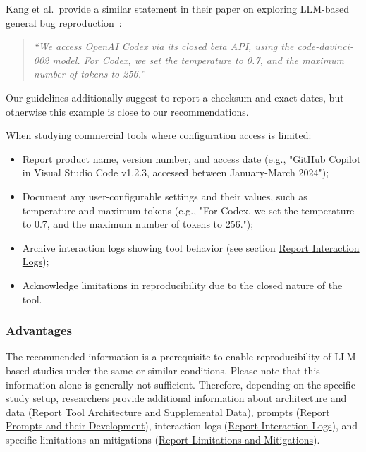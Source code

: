Kang et al.~provide a similar statement in their paper on exploring LLM-based general bug reproduction~\cite{DBLP:conf/icse/KangYY23}:

\begin{quote}
\it
``We access OpenAI Codex via its closed beta API, using the code-davinci-002 model. For Codex, we set the temperature to 0.7, and the maximum number of tokens to 256.''
\end{quote}

Our guidelines additionally suggest to report a checksum and exact dates, but otherwise this example is close to our recommendations. 


When studying commercial tools where configuration access is limited:
\begin{itemize}
\item Report product name, version number, and access date (e.g., "GitHub Copilot in Visual Studio Code v1.2.3, accessed between January-March 2024");
\item Document any user-configurable settings and their values, such as temperature and maximum tokens (e.g., "For Codex, we set the temperature to 0.7, and the maximum number of tokens to 256.");
\item Archive interaction logs showing tool behavior (see section \href{/guidelines/report-interaction-logs}{Report Interaction Logs});
\item Acknowledge limitations in reproducibility due to the closed nature of the tool.
\end{itemize}


\subsubsection{Advantages}

The recommended information is a prerequisite to enable reproducibility of LLM-based studies under the same or similar conditions.
Please note that this information alone is generally not sufficient.
Therefore, depending on the specific study setup, researchers \should provide additional information about architecture and data (\href{/guidelines/#report-tool-architecture-and-supplemental-data}{Report Tool Architecture and Supplemental Data}), prompts (\href{/guidelines/#report-prompts-and-their-development}{Report Prompts and their Development}), interaction logs (\href{/guidelines//#report-interaction-logs}{Report Interaction Logs}), and specific limitations an mitigations (\href{/guidelines/#report-limitations-and-mitigations}{Report Limitations and Mitigations}).

